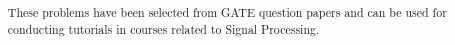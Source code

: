 \documentclass[journal,12pt,twocolumn]{IEEEtran}
\begin{document}
\let\StandardTheFigure\thefigure
\renewcommand{\thefigure}{\theproblem}


\def\putbox#1#2#3{\makebox[0in][l]{\makebox[#1][l]{}\raisebox{\baselineskip}[0in][0in]{\raisebox{#2}[0in][0in]{#3}}}}
     \def\rightbox#1{\makebox[0in][r]{#1}}
     \def\centbox#1{\makebox[0in]{#1}}
     \def\topbox#1{\raisebox{-\baselineskip}[0in][0in]{#1}}
     \def\midbox#1{\raisebox{-0.5\baselineskip}[0in][0in]{#1}}


\title{
}
%
\maketitle


\bigskip
\begin{abstract}
These problems have been selected from GATE question papers and can be used for conducting
tutorials in courses related to Signal Processing.
\end{abstract}
\end{document}

